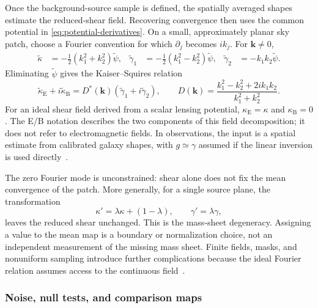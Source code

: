 Once the background-source sample is defined, the spatially averaged shapes estimate the reduced-shear field. Recovering convergence then uses the common potential in \cref{eq:potential-derivatives}. On a small, approximately planar sky patch, choose a Fourier convention for which $\partial_j$ becomes $ik_j$. For $\boldsymbol{k}\ne0$,
\begin{align}
    \widetilde\kappa&=-\tfrac12(k_1^2+k_2^2)\widetilde\psi, &
    \widetilde\gamma_1&=-\tfrac12(k_1^2-k_2^2)\widetilde\psi, &
    \widetilde\gamma_2&=-k_1k_2\widetilde\psi.
    \label{eq:fourier-potential}
\end{align}
Eliminating $\widetilde\psi$ gives the Kaiser--Squires relation
\begin{equation}
    \widetilde\kappa_{\mathrm{E}}+i\widetilde\kappa_{\mathrm{B}}
    =D^*(\boldsymbol{k})(\widetilde\gamma_1+i\widetilde\gamma_2),
    \qquad
    D(\boldsymbol{k})=\frac{k_1^2-k_2^2+2ik_1k_2}{k_1^2+k_2^2}.
    \label{eq:kaiser-squires}
\end{equation}
For an ideal shear field derived from a scalar lensing potential, $\kappa_{\mathrm{E}}=\kappa$ and $\kappa_{\mathrm{B}}=0$. The E/B notation describes the two components of this field decomposition; it does not refer to electromagnetic fields. In observations, the input is a spatial estimate from calibrated galaxy shapes, with $g\simeq\gamma$ assumed if the linear inversion is used directly~\cite{kaiser_mapping_1993,schneider_weak_2006}.

The zero Fourier mode is unconstrained: shear alone does not fix the mean convergence of the patch. More generally, for a single source plane, the transformation
\begin{equation}
    \kappa'=\lambda\kappa+(1-\lambda),\qquad
    \gamma'=\lambda\gamma,
    \label{eq:mass-sheet}
\end{equation}
leaves the reduced shear unchanged. This is the mass-sheet degeneracy. Assigning a value to the mean map is a boundary or normalization choice, not an independent measurement of the missing mass sheet. Finite fields, masks, and nonuniform sampling introduce further complications because the ideal Fourier relation assumes access to the continuous field~\cite{schneider_weak_2006}.

\subsubsection{Noise, null tests, and comparison maps}


